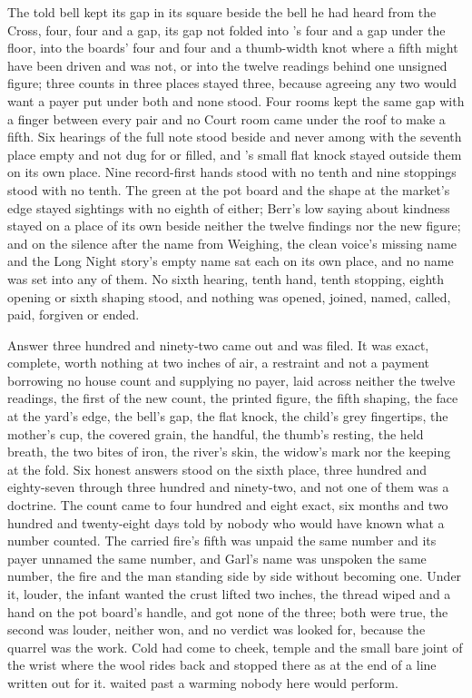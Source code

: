 The told bell kept its gap in its square beside the bell he had heard from the Cross, four, four and a gap, its gap not folded into 's four and a gap under the floor, into the boards' four and four and a thumb-width knot where a fifth might have been driven and was not, or into the twelve readings behind one unsigned figure; three counts in three places stayed three, because agreeing any two would want a payer put under both and none stood. Four rooms kept the same gap with a finger between every pair and no Court room came under the roof to make a fifth. Six hearings of the full note stood beside and never among with the seventh place empty and not dug for or filled, and 's small flat knock stayed outside them on its own place. Nine record-first hands stood with no tenth and nine stoppings stood with no tenth. The green at the pot board and the shape at the market's edge stayed sightings with no eighth of either; Berr's low saying about kindness stayed on a place of its own beside neither the twelve findings nor the new figure; and on  the silence after the name from Weighing, the clean voice's missing name and the Long Night story's empty name sat each on its own place, and no name was set into any of them. No sixth hearing, tenth hand, tenth stopping, eighth opening or sixth shaping stood, and nothing was opened, joined, named, called, paid, forgiven or ended.

Answer three hundred and ninety-two came out and was filed. It was exact, complete, worth nothing at two inches of air, a restraint and not a payment borrowing no house count and supplying no payer, laid across neither the twelve readings, the first of the new count, the printed figure, the fifth shaping, the face at the yard's edge, the bell's gap, the flat knock, the child's grey fingertips, the mother's cup, the covered grain, the handful, the thumb's resting, the held breath, the two bites of iron, the river's skin, the widow's mark nor the keeping at the fold. Six honest answers stood on the sixth place, three hundred and eighty-seven through three hundred and ninety-two, and not one of them was a doctrine. The count came to four hundred and eight exact, six months and two hundred and twenty-eight days told by nobody who would have known what a number counted. The carried fire's fifth was unpaid the same number and its payer unnamed the same number, and Garl's name was unspoken the same number, the fire and the man standing side by side without becoming one. Under it, louder, the infant wanted the crust lifted two inches, the thread wiped and a hand on the pot board's handle, and got none of the three; both were true, the second was louder, neither won, and no verdict was looked for, because the quarrel was the work. Cold had come to cheek, temple and the small bare joint of the wrist where the wool rides back and stopped there as at the end of a line written out for it.  waited past a warming nobody here would perform.

